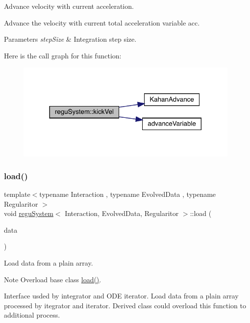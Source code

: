 Advance velocity with current acceleration. 

Advance the velocity with current total acceleration variable \textquotesingle{}acc\textquotesingle{}. 
\begin{DoxyParams}{Parameters}
{\em step\+Size} & Integration step size. \\
\hline
\end{DoxyParams}
Here is the call graph for this function\+:
\nopagebreak
\begin{figure}[H]
\begin{center}
\leavevmode
\includegraphics[width=312pt]{classregu_system_a16cf42c1efb79a8ed5f9fecad7ad13dc_cgraph}
\end{center}
\end{figure}
\mbox{\label{classregu_system_a4da424f127c024fcbef32eff3147b2ff}} 
\subsubsection{\texorpdfstring{load()}{load()}}
{\footnotesize\ttfamily template$<$typename Interaction , typename Evolved\+Data , typename Regularitor $>$ \\
void \mbox{\hyperlink{classregu_system}{regu\+System}}$<$ Interaction, Evolved\+Data, Regularitor $>$\+::load (\begin{DoxyParamCaption}\item[{\mbox{\hyperlink{classregu_system_ae2ca73edf865e016a858b694c1d2b49a}{Plain\+Array}} \&}]{data }\end{DoxyParamCaption})}



Load data from a plain array. 

\begin{DoxyNote}{Note}
Overload base class \mbox{\hyperlink{classregu_system_a4da424f127c024fcbef32eff3147b2ff}{load()}}.
\end{DoxyNote}
Interface usded by integrator and O\+DE iterator. Load data from a plain array processed by itegrator and iterator. Derived class could overload this function to additional process.


